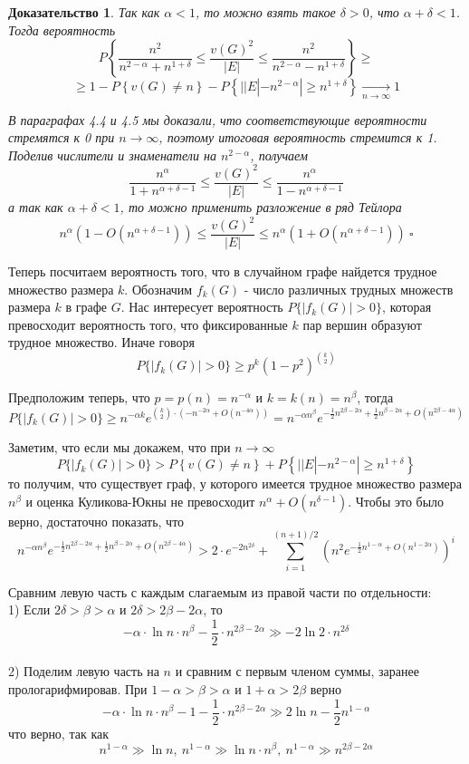 \documentclass[a4paper]{article}
\newtheorem*{msolution}{Доказательство}
\begin{document}
\begin{msolution}
   Так как $\alpha < 1$, то можно взять такое $\delta > 0$, что $\alpha + \delta < 1$. Тогда вероятность 
   $$P\left\{\frac{n^2}{n^{2-\alpha} + n^{1+\delta}} \leq \frac{v(G)^2}{|E|} \leq \frac{n^2}{n^{2-\alpha} - n^{1+\delta}} \right\}
    \geq $$ $$ \geq 1 - P\left\{v(G) \neq n\right\} - P\left\{||E| - n^{2-\alpha}| \geq
n^{1+\delta}\right\} \xrightarrow[n \to \infty]{} 1$$

В параграфах 4.4 и 4.5 мы доказали, что соответствующие вероятности стремятся к 0 при $n \to \infty$, 
поэтому итоговая вероятность стремится к 1. Поделив числители и знаменатели на $n^{2-\alpha}$, получаем 
$$\frac{n^{\alpha}}{1 + n^{\alpha + \delta - 1}} \leq \frac{v(G)^2}{|E|} \leq \frac{n^{\alpha}}{1 - n^{\alpha + \delta - 1}}$$
а так как $\alpha + \delta < 1$, то можно применить разложение в ряд Тейлора
$$n^{\alpha}\left(1 - O(n^{\alpha + \delta - 1})\right) \leq \frac{v(G)^2}{|E|} \leq n^{\alpha}\left(1 + O(n^{\alpha + \delta - 1})\right)\ \square$$
\end{msolution}

Теперь посчитаем вероятность того, что в случайном графе найдется трудное множество размера $k$. 
Обозначим $f_k(G)$ - число различных трудных множеств размера $k$ в графе $G$. Нас интересует 
вероятность $P\{|f_k(G)| > 0\}$, которая превосходит вероятность того, что фиксированные $k$ пар 
вершин образуют трудное множество. Иначе говоря $$P\{|f_k(G)| > 0\} \geq p^k\left(1-p^2\right)^{\binom{k}{2}}$$

Предположим теперь, что $p = p(n) = n^{-\alpha}$ и $k = k(n) = n^{\beta}$, тогда $$P\{|f_k(G)| > 0\} \geq 
n^{-\alpha k}e^{\binom{k}{2}\cdot(-n^{-2\alpha} + O(n^{-4\alpha}))} = n^{-\alpha n^{\beta}} 
e^{-\frac{1}{2}n^{2\beta-2\alpha} + \frac{1}{2}n^{\beta - 2\alpha} + O(n^{2\beta - 4\alpha})}$$

Заметим, что если мы докажем, что при $n \rightarrow \infty$ $$P\{|f_k(G)| > 0\} > P\left\{v(G) \neq n\right\} + P\left\{||E| - n^{2-\alpha}| \geq
n^{1+\delta}\right\}$$ то получим, что существует граф, у которого имеется трудное множество 
размера $n^\beta$ и оценка Куликова-Юкны не превосходит $n^{\alpha} + O(n^{\delta-1})$. Чтобы это было верно, достаточно показать, что 
$$n^{-\alpha n^{\beta}} e^{-\frac{1}{2}n^{2\beta-2\alpha} + \frac{1}{2}n^{\beta - 2\alpha} + O(n^{2\beta - 4\alpha})} > 
2\cdot e^{-2n^{2\delta}} + \sum\limits_{i=1}^{(n+1)/2}\left(n^2e^{-\frac{1}{2}n^{1-\alpha} + O(n^{1-2\alpha})}\right)^i$$

Сравним левую часть с каждым слагаемым из правой части по отдельности:\ \\
1) Если $2\delta > \beta > \alpha$ и $2\delta > 2\beta - 2\alpha$, то $$-\alpha\cdot \ln{n}\cdot n^{\beta} - 
\frac{1}{2}\cdot n^{2\beta - 2\alpha} \gg -2\ln{2}\cdot n^{2\delta}$$\ \\
2) Поделим левую часть на $n$ и сравним с первым членом суммы, заранее прологарифмировав. При 
$1-\alpha > \beta > \alpha$ и $1+\alpha > 2\beta$ верно $$-\alpha\cdot \ln{n}\cdot n^{\beta} - 1 -
\frac{1}{2}\cdot n^{2\beta - 2\alpha} \gg 2\ln{n} - \frac{1}{2}n^{1-\alpha}$$ что верно, так как 
$$n^{1-\alpha} \gg \ln{n},\ n^{1-\alpha} \gg \ln{n}\cdot n^{\beta},\ n^{1-\alpha} \gg n^{2\beta - 2\alpha}$$
\end{document}
